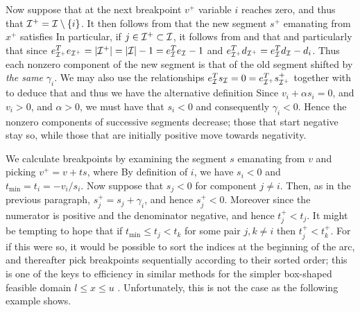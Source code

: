 \documentclass[12pt,twoside]{article}
\newcommand{\tmin}{t_{\min}}
\begin{document}
Now suppose that at the next breakpoint $v^+$ variable $i$ reaches zero,
and thus that ${\cal I}^+ = {\cal I} \setminus \{i\}$. It then follows from 
that the new segment $s^+$ emanating from $x^+$ satisfies
In particular, if $j \in {\cal I}^+ \subset {\cal I}$,  it follows from
 and  that
and particularly that
since $e_{{\cal I}^+}^T e_{{\cal I}^+} = |{\cal I}^+| = |{\cal I}|- 1 = e_{{\cal I}}^T e_{{\cal I}} -1$
and
$e_{{\cal I}^+}^T d_{{\cal I}^+} = e_{{\cal I}}^T d_{{\cal I}} - d_i$. Thus each nonzero
component of the new segment is that of the old segment shifted by
{\em the same} $\gamma_i$. We may also use the relationships
$e_{{\cal I}}^T s_{{\cal I}} = 0 = e_{{\cal I}^+}^T s^+_{{\cal I}^+}$ together with  to
deduce that
and thus we have the alternative definition
Since $v_i + \alpha s_i = 0$, and $v_i > 0$, and $\alpha > 0$, we must have
that $s_i < 0$ and consequently $\gamma_i < 0$. Hence the nonzero components
of successive segments decrease; those that start negative stay so, while
those that are initially positive move towards negativity.

We calculate breakpoints by examining the segment $s$ emanating from $v$
and picking $v^+ = v + t s$, where
\disp{\tmin = \min_{s_j<0} t_j, \; \mbox{where}\; t_j = - v_j/s_j.}
By definition of $i$, we have $s_i < 0$ and $\tmin = t_i = - v_i/s_i$.
Now suppose that $s_j < 0$ for component $j \neq i$. Then, as in the
previous paragraph, $s_j^+ = s_j + \gamma_i$, and hence $s_j^+ < 0$.
Moreover
since the numerator is positive and the denominator negative,
and hence $t_j^+ < t_j$. It might be tempting to hope that if
$\tmin \leq t_j < t_k$ for some pair $j,k \neq i$ then $t^+_j < t^+_k$.
For if this were so, it would be possible to sort the indices at the
beginning of the arc, and thereafter pick breakpoints sequentially
according to their sorted order;
this is one of the keys to efficiency in similar methods for the
simpler box-shaped feasible domain $l \leq x \leq u$
\cite[\S17.3]{ConnGoulToin00}.
Unfortunately, this is not the case as the following example shows.
\end{document}
